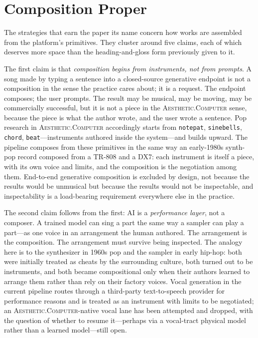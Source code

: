 \documentclass[10pt,letterpaper,twocolumn]{article}
\newcommand{\ac}{\textsc{Aesthetic.Computer}}
\begin{document}
\section{Composition Proper}

The strategies that earn the paper its name concern how works are assembled from the platform's primitives. They cluster around five claims, each of which deserves more space than the heading-and-gloss form previously given to it.

The first claim is that \emph{composition begins from instruments, not from prompts}. A song made by typing a sentence into a closed-source generative endpoint is not a composition in the sense the practice cares about; it is a request. The endpoint composes; the user prompts. The result may be musical, may be moving, may be commercially successful, but it is not a piece in the \ac{} sense, because the piece is what the author wrote, and the user wrote a sentence. Pop research in \ac{} accordingly starts from \texttt{notepat}, \texttt{sinebells}, \texttt{chord}, \texttt{beat}---instruments authored inside the system---and builds upward. The pipeline composes from these primitives in the same way an early-1980s synth-pop record composed from a TR-808 and a DX7: each instrument is itself a piece, with its own voice and limits, and the composition is the negotiation among them. End-to-end generative composition is excluded by design, not because the results would be unmusical but because the results would not be inspectable, and inspectability is a load-bearing requirement everywhere else in the practice.

The second claim follows from the first: AI is a \emph{performance layer}, not a composer. A trained model can sing a part the same way a sampler can play a part---as one voice in an arrangement the human authored. The arrangement is the composition. The arrangement must survive being inspected. The analogy here is to the synthesizer in 1960s pop and the sampler in early hip-hop: both were initially treated as cheats by the surrounding culture, both turned out to be instruments, and both became compositional only when their authors learned to arrange them rather than rely on their factory voices. Vocal generation in the current pipeline routes through a third-party text-to-speech provider for performance reasons and is treated as an instrument with limits to be negotiated; an \ac{}-native vocal lane has been attempted and dropped, with the question of whether to resume it---perhaps via a vocal-tract physical model rather than a learned model---still open.
\end{document}

